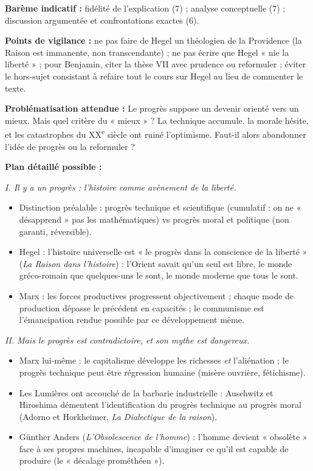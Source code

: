 \documentclass[11pt]{article}
\begin{document}
\begin{corrige}
\textbf{Barème indicatif :} fidélité de l'explication (7) ; analyse conceptuelle (7) ; discussion argumentée et confrontations exactes (6).

\textbf{Points de vigilance :} ne pas faire de Hegel un théologien de la Providence (la Raison est immanente, non transcendante) ; ne pas écrire que Hegel « nie la liberté » ; pour Benjamin, citer la thèse VII avec prudence ou reformuler ; éviter le hors-sujet consistant à refaire tout le cours sur Hegel au lieu de commenter le texte.
\end{corrige}

\begin{corrige}
\textbf{Problématisation attendue :} Le progrès suppose un devenir orienté vers un mieux. Mais quel critère du « mieux » ? La technique accumule, la morale hésite, et les catastrophes du XX\textsuperscript{e} siècle ont ruiné l'optimisme. Faut-il alors abandonner l'idée de progrès ou la reformuler ?

\textbf{Plan détaillé possible :}

\emph{I. Il y a un progrès : l'histoire comme avènement de la liberté.}
\begin{itemize}
\item Distinction préalable : progrès technique et scientifique (cumulatif : on ne « désapprend » pas les mathématiques) vs progrès moral et politique (non garanti, réversible).
\item Hegel : l'histoire universelle est « le progrès dans la conscience de la liberté » (\emph{La Raison dans l'histoire}) : l'Orient savait qu'un seul est libre, le monde gréco-romain que quelques-uns le sont, le monde moderne que tous le sont.
\item Marx : les forces productives progressent objectivement ; chaque mode de production dépasse le précédent en capacités ; le communisme est l'émancipation rendue possible par ce développement même.
\end{itemize}

\emph{II. Mais le progrès est contradictoire, et son mythe est dangereux.}
\begin{itemize}
\item Marx lui-même : le capitalisme développe les richesses \emph{et} l'aliénation ; le progrès technique peut être régression humaine (misère ouvrière, fétichisme).
\item Les Lumières ont accouché de la barbarie industrielle : Auschwitz et Hiroshima démentent l'identification du progrès technique au progrès moral (Adorno et Horkheimer, \emph{La Dialectique de la raison}).
\item Günther Anders (\emph{L'Obsolescence de l'homme}) : l'homme devient « obsolète » face à ses propres machines, incapable d'imaginer ce qu'il est capable de produire (le « décalage prométhéen »).
\end{itemize}


\end{corrige}
\end{document}
